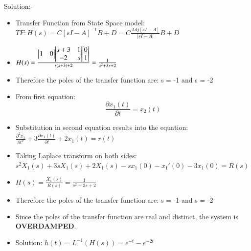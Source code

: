 \documentclass[journal,12pt,twocolumn]{IEEEtran}
\begin{document}
\begin{frame}{Solution:- }
\begin{frame}{}
    \begin{itemize}
        \item Transfer Function from State Space model: $TF: H(s) = C[sI-A]^{-1}B + D = C\frac{Adj[sI-A]}{|sI-A|}B + D$
        \item $H(s) = \frac{\begin{bmatrix}
        1 & 0
        \end{bmatrix}\begin{bmatrix}
        s+3 & 1\\
        -2 & s
        \end{bmatrix}\begin{bmatrix}
        0\\
        1
        \end{bmatrix}}{s(s+3) + 2} = \LARGE{\frac{1}{s^{2}+3s+2}}$
        \item Therefore the poles of the transfer function are: s = -1 and s = -2
    \end{itemize}
\end{frame}



\begin{frame}{}
\begin{block}
\begin{itemize}
\item From first equation: $$\frac{\partial x_1(t)}{\partial t} =              x_2(t) $$
\item Substitution in second equation results into the equation:\vspace{5} $\frac{\partial^2 x_1}{\partial t^2} + 3\frac{\partial x_1(t)}{\partial t} + 2x_1(t) = r(t)$ 
\item Taking Laplace transform on both sides:\vspace{5}
$s^2X_1(s) + 3sX_1(s) + 2X_1(s) - sx_1(0) - x_1'(0) -3x_1(0)  = R(s)$
\item $ H(s) = \frac{X_1(s)}{R(s)} = \frac{1}{s^2 + 3s + 2}$
\item Therefore the poles of the transfer function are: s = -1 and s = -2
\end{itemize}
\end{block}

\end{frame}

\begin{frame}{}

\begin{itemize}
    \item Since the poles of the transfer function are real and distinct, the system is \textbf{OVERDAMPED}.
    \item Solution: $h(t) = L^{-1}(H(s)) = e^{-t} - e^{-2t}$
    \\\\\\
\end{itemize}


\end{frame}
\end{frame}
\end{document}
